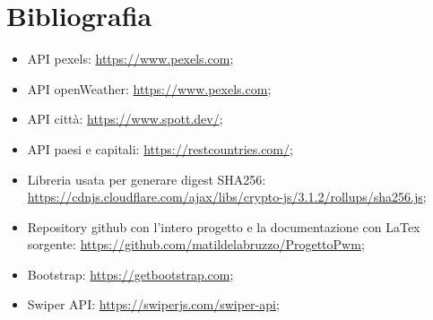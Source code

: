 \chapter{Bibliografia}

\begin{itemize}
    \item API pexels: \url{https://www.pexels.com};
    \item API openWeather: \url{https://www.pexels.com};
    \item API città: \url{https://www.spott.dev/};
    \item API paesi e capitali: \url{https://restcountries.com/};
    \item Libreria usata per generare digest SHA256: \url{https://cdnjs.cloudflare.com/ajax/libs/crypto-js/3.1.2/rollups/sha256.js};
    \item Repository github con l'intero progetto e la documentazione con LaTex sorgente: \url{https://github.com/matildelabruzzo/ProgettoPwm};
    \item Bootstrap: \url{https://getbootstrap.com};
    \item Swiper API: \url{https://swiperjs.com/swiper-api};
\end{itemize}
